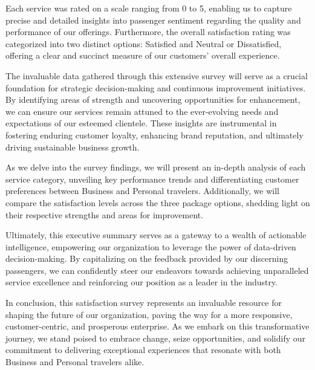 \documentclass[11pt]{article}
\begin{document}
Each service was rated on a scale ranging from 0 to 5, enabling us to capture precise and detailed insights into passenger sentiment regarding the quality and performance of our offerings. Furthermore, the overall satisfaction rating was categorized into two distinct options: Satisfied and Neutral or Dissatisfied, offering a clear and succinct measure of our customers' overall experience.

The invaluable data gathered through this extensive survey will serve as a crucial foundation for strategic decision-making and continuous improvement initiatives. By identifying areas of strength and uncovering opportunities for enhancement, we can ensure our services remain attuned to the ever-evolving needs and expectations of our esteemed clientele. These insights are instrumental in fostering enduring customer loyalty, enhancing brand reputation, and ultimately driving sustainable business growth.

As we delve into the survey findings, we will present an in-depth analysis of each service category, unveiling key performance trends and differentiating customer preferences between Business and Personal travelers. Additionally, we will compare the satisfaction levels across the three package options, shedding light on their respective strengths and areas for improvement.

Ultimately, this executive summary serves as a gateway to a wealth of actionable intelligence, empowering our organization to leverage the power of data-driven decision-making. By capitalizing on the feedback provided by our discerning passengers, we can confidently steer our endeavors towards achieving unparalleled service excellence and reinforcing our position as a leader in the industry.

In conclusion, this satisfaction survey represents an invaluable resource for shaping the future of our organization, paving the way for a more responsive, customer-centric, and prosperous enterprise. As we embark on this transformative journey, we stand poised to embrace change, seize opportunities, and solidify our commitment to delivering exceptional experiences that resonate with both Business and Personal travelers alike.
\end{document}
